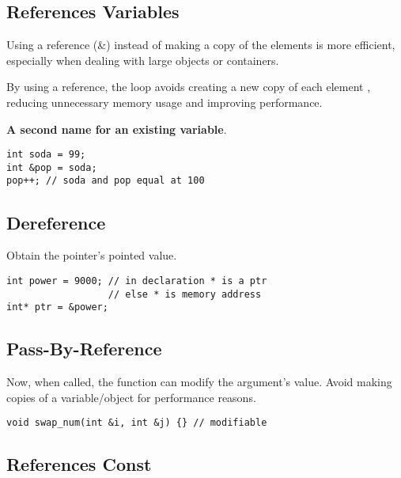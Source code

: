 \subsection{References Variables}

Using a reference (\&) instead of making a copy of the elements is more efficient,
especially when dealing with large objects or containers. 

By using a reference, the loop avoids creating a new copy of each element
, reducing unnecessary memory usage and improving performance.

\textbf{A second name for an existing variable}.

\begin{verbatim}
int soda = 99;
int &pop = soda;
pop++; // soda and pop equal at 100
\end{verbatim}

\subsection{Dereference}

Obtain the pointer's pointed value. 

\begin{verbatim}
int power = 9000; // in declaration * is a ptr
                  // else * is memory address
int* ptr = &power;
\end{verbatim}

\subsection{Pass-By-Reference}

Now, when called, the function can modify the argument's value.
Avoid making copies of a variable/object for performance reasons.

\begin{verbatim}
void swap_num(int &i, int &j) {} // modifiable
\end{verbatim}

\subsection{References Const}

